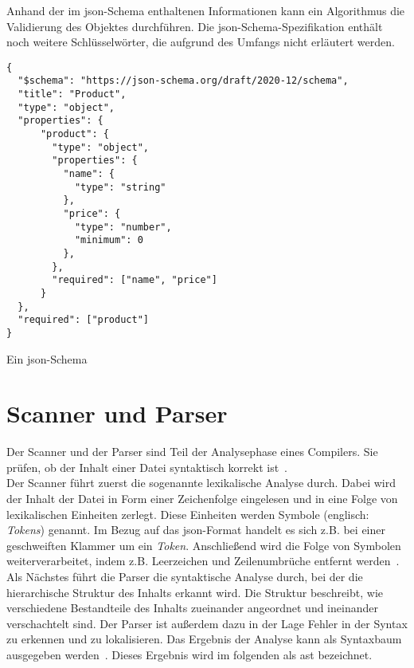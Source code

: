 Anhand der im \acs{json}-Schema enthaltenen Informationen kann ein Algorithmus die Validierung des Objektes durchführen.
Die \acs{json}-Schema-Spezifikation enthält noch weitere Schlüsselwörter, die aufgrund des Umfangs nicht erläutert werden.

\begin{listing}[htp]
      \begin{verbatim}
{
  "$schema": "https://json-schema.org/draft/2020-12/schema",
  "title": "Product",
  "type": "object",
  "properties": {
      "product": {
        "type": "object",
        "properties": {
          "name": {
            "type": "string"
          },
          "price": {
            "type": "number", 
            "minimum": 0
          },
        },
        "required": ["name", "price"]
      }
  },
  "required": ["product"]
}
      \end{verbatim}
      \caption{Ein \acs{json}-Schema}
      \label{lst:json-schema}
\end{listing}

\section{Scanner und Parser}\label{sec:parser}

Der Scanner und der Parser sind Teil der Analysephase eines Compilers. Sie prüfen, ob der Inhalt einer Datei syntaktisch korrekt ist~\cite{SommerGumm+2019+113+148}.
\\
Der Scanner führt zuerst die sogenannte lexikalische Analyse durch. Dabei wird der Inhalt der Datei in Form einer
Zeichenfolge eingelesen und in eine Folge von lexikalischen Einheiten zerlegt.
Diese Einheiten werden Symbole (englisch: \textit{Tokens}) genannt.
Im Bezug auf das \ac{json}-Format handelt es sich z.B. bei einer geschweiften Klammer um ein \textit{Token}.
Anschließend wird die Folge von Symbolen weiterverarbeitet, indem z.B. Leerzeichen und Zeilenumbrüche entfernt werden~\cite{syntax-analysis}.
\\
Als Nächstes führt die Parser die syntaktische Analyse durch, bei der die hierarchische Struktur des Inhalts erkannt wird.
Die Struktur beschreibt, wie verschiedene Bestandteile des Inhalts zueinander angeordnet und ineinander verschachtelt sind.
Der Parser ist außerdem dazu in der Lage Fehler in der Syntax zu erkennen und zu lokalisieren.
Das Ergebnis der Analyse kann als Syntaxbaum ausgegeben werden~\cite{syntax-analysis}.
Dieses Ergebnis wird im folgenden als \ac{ast} bezeichnet.

